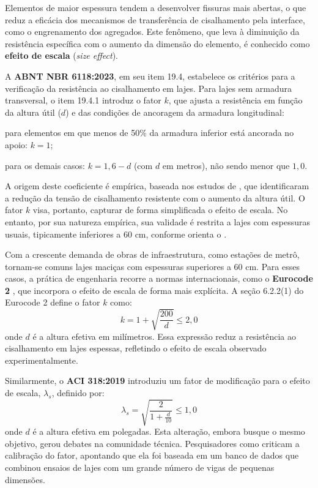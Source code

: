 \documentclass[
	12pt,				%
	openright,			%
	twoside,			%
	a4paper,			%
	chapter=TITLE,		%
	section=TITLE,		%
	subsection=TITLE,	%
	subsubsection=TITLE,%
	partnum=false,
	brazil,			%
]{abntex2}
\begin{document}
Elementos de maior espessura tendem a desenvolver fissuras mais abertas, o que reduz a eficácia dos mecanismos de transferência de cisalhamento pela interface, como o engrenamento dos agregados. Este fenômeno, que leva à diminuição da resistência específica com o aumento da dimensão do elemento, é conhecido como \textbf{efeito de escala} (\textit{size effect}).

A \textbf{ABNT NBR 6118:2023}, em seu item 19.4, estabelece os critérios para a verificação da resistência ao cisalhamento em lajes. Para lajes sem armadura transversal, o item 19.4.1 introduz o fator $k$, que ajusta a resistência em função da altura útil ($d$) e das condições de ancoragem da armadura longitudinal:
\begin{alineas}
    \item para elementos em que menos de 50\% da armadura inferior está ancorada no apoio: $k = 1$;
    \item para os demais casos: $k = 1{,}6 - d$ (com $d$ em metros), não sendo menor que $1{,}0$.
\end{alineas}

A origem deste coeficiente é empírica, baseada nos estudos de \textcite{Hedman1975shear}, que identificaram a redução da tensão de cisalhamento resistente com o aumento da altura útil. O fator $k$ visa, portanto, capturar de forma simplificada o efeito de escala. No entanto, por sua natureza empírica, sua validade é restrita a lajes com espessuras usuais, tipicamente inferiores a 60 cm, conforme orienta o \textcite{IBRACON2020}.

Com a crescente demanda de obras de infraestrutura, como estações de metrô, tornam-se comuns lajes maciças com espessuras superiores a 60 cm. Para esses casos, a prática de engenharia recorre a normas internacionais, como o \textbf{Eurocode 2} \cite{CEN2004}, que incorpora o efeito de escala de forma mais explícita. A seção 6.2.2(1) do Eurocode 2 define o fator $k$ como:
\begin{equation}
    k = 1 + \sqrt{\frac{200}{d}} \leq 2,0
\end{equation}
onde $d$ é a altura efetiva em milímetros. Essa expressão reduz a resistência ao cisalhamento em lajes espessas, refletindo o efeito de escala observado experimentalmente.

Similarmente, o \textbf{ACI 318:2019} \cite{ACI318:2019} introduziu um fator de modificação para o efeito de escala, $\lambda_s$, definido por:
\begin{equation}
    \lambda_s = \sqrt{\frac{2}{1+\frac{d}{10}}}\leq 1,0
\end{equation}
onde $d$ é a altura efetiva em polegadas. Esta alteração, embora busque o mesmo objetivo, gerou debates na comunidade técnica. Pesquisadores como \textcite{Marquesi2021} criticam a calibração do fator, apontando que ela foi baseada em um banco de dados que combinou ensaios de lajes com um grande número de vigas de pequenas dimensões.
\end{document}
